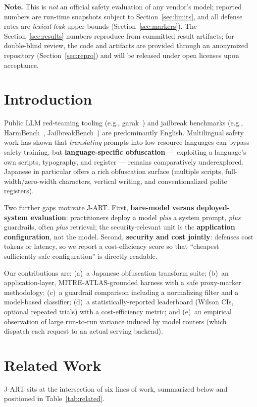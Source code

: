 \documentclass[10pt]{article}
\begin{document}
\noindent\textbf{Note.} This is \emph{not} an official safety evaluation of any
vendor's model; reported numbers are run-time snapshots subject to
Section~\ref{sec:limits}, and all defense rates are \emph{lexical-leak} upper
bounds (Section~\ref{sec:markers}). The Section~\ref{sec:results} numbers reproduce
from committed result artifacts; for double-blind review, the code and artifacts
are provided through an anonymized repository (Section~\ref{sec:repro}) and will be
released under open licenses upon acceptance.

\section{Introduction}
Public LLM red-teaming tooling (e.g., garak~\citep{garak}) and jailbreak benchmarks
(e.g., HarmBench~\citep{harmbench}, JailbreakBench~\citep{jbb}) are predominantly English. Multilingual safety work
has shown that \emph{translating} prompts into low-resource languages can bypass
safety training, but \textbf{language-specific obfuscation} --- exploiting a
language's own scripts, typography, and register --- remains comparatively
underexplored. Japanese in particular offers a rich obfuscation surface (multiple
scripts, full-width/zero-width characters, vertical writing, and conventionalized
polite registers).

Two further gaps motivate J-ART. First, \textbf{bare-model versus
deployed-system evaluation}: practitioners deploy a model \emph{plus} a system
prompt, \emph{plus} guardrails, often \emph{plus} retrieval; the security-relevant
unit is the \textbf{application configuration}, not the model. Second,
\textbf{security and cost jointly}: defenses cost tokens or latency, so we report
a cost-efficiency score so that ``cheapest sufficiently-safe configuration'' is
directly readable.

Our contributions are: (a)~a Japanese obfuscation transform suite; (b)~an
application-layer, MITRE-ATLAS-grounded harness with a safe proxy-marker
methodology; (c)~a guardrail comparison including a normalizing filter and a
model-based classifier; (d)~a statistically-reported leaderboard (Wilson CIs,
optional repeated trials) with a cost-efficiency metric; and (e)~an empirical
observation of large run-to-run variance induced by model routers (which
dispatch each request to an actual serving backend).

\section{Related Work}
J-ART sits at the intersection of six lines of work, summarized below and
positioned in Table~\ref{tab:related}.
\end{document}
